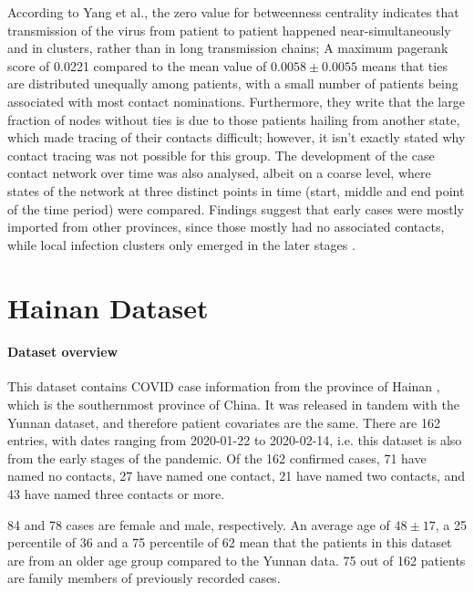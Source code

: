 According to Yang et al., the zero value for betweenness centrality indicates that transmission of the virus from patient to patient happened near-simultaneously and in clusters, rather than in long transmission chains; A maximum pagerank score of 0.0221 compared to the mean value of $0.0058\pm0.0055$ means that ties are distributed unequally among patients, with a small number of patients being associated with most contact nominations. Furthermore, they write that the large fraction of nodes without ties is due to those patients hailing from another state, which made tracing of their contacts difficult; however, it isn't exactly stated why contact tracing was not possible for this group. The development of the case contact network over time was also analysed, albeit on a coarse level, where states of the network at three distinct points in time (start, middle and end point of the time period) were compared. Findings suggest that early cases were mostly imported from other provinces, since those mostly had no associated contacts, while local infection clusters only emerged in the later stages \cite{hainan_publication}. 

\section{Hainan Dataset}
\label{sec:hainan_data}

\paragraph{Dataset overview} This dataset contains COVID case information from the province of Hainan \cite{hainan_data}, which is the southernmost province of China. It was released in tandem with the Yunnan dataset, and therefore patient covariates are the same. There are 162 entries, with dates ranging from 2020-01-22 to 2020-02-14, i.e. this dataset is also from the early stages of the pandemic. Of the 162 confirmed cases, 71 have named no contacts, 27 have named one contact, 21 have named two contacts, and 43 have named three contacts or more. 

84 and 78 cases are female and male, respectively. An average age of $48\pm17$, a 25 percentile of 36 and a 75 percentile of 62 mean that the patients in this dataset are from an older age group compared to the Yunnan data. 75 out of 162 patients are family members of previously recorded cases.

